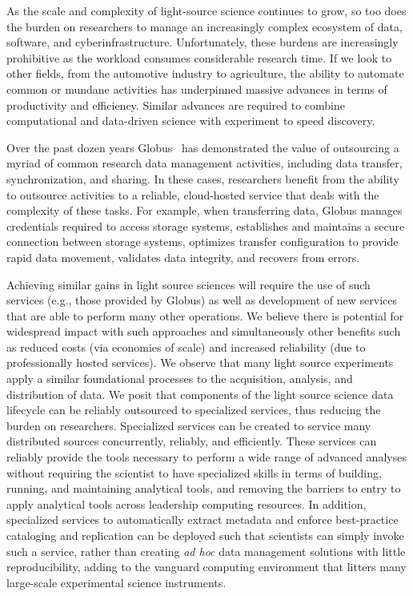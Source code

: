 \documentclass{aip-cp}
\newcommand\ian[1]{}
\newcommand\ryan[1]{}
\newcommand\ian[1]{{\color{red}[Ian: #1]}}
\newcommand\ryan[1]{{\color{green}[Ryan: #1]}}
\begin{document}
%


As the scale and complexity of light-source science continues to grow, so too
does the burden on researchers to manage an increasingly complex ecosystem of
data, software, and cyberinfrastructure.  Unfortunately, these burdens are
increasingly prohibitive as the workload consumes considerable
research time. If we look to other fields, from the automotive
industry to agriculture, the ability to automate common or mundane activities has
underpinned massive advances in terms of productivity and efficiency. Similar
advances are required to combine computational and data-driven science with
experiment to speed discovery.

Over the past dozen years Globus~\cite{chard14globus} has demonstrated the value of outsourcing
a myriad of common research data management activities, including data 
transfer, synchronization, and sharing. In these cases, researchers benefit
from the ability to outsource activities to a reliable, cloud-hosted
service that deals with the complexity of these tasks. For example, 
when transferring data, Globus manages credentials required to access
storage systems, establishes and maintains a secure connection between
storage systems, optimizes transfer configuration to provide rapid
data movement, validates data integrity, and recovers from errors. 

Achieving similar gains in light source sciences will require 
the use of such services (e.g., those provided by Globus) as 
well as development of new services that are able to perform 
many other operations.  We believe there is potential for widespread
impact with such approaches and simultaneously other benefits
such as reduced costs (via economies of scale) and increased reliability
(due to professionally hosted services). We observe that many 
light source experiments apply a similar foundational processes to the acquisition,
analysis, and  distribution of data. We posit that components of the light
source science data lifecycle can be reliably outsourced to specialized
services, thus reducing the burden on researchers. Specialized services can be
created to service many distributed sources concurrently, reliably, and efficiently.
These services can reliably provide the tools necessary to  perform a wide
range of advanced analyses without requiring the scientist to have specialized
skills in terms of building, running, and maintaining analytical tools, and
removing the barriers to entry to apply analytical tools across leadership
computing resources. In addition, specialized services to automatically
extract metadata and enforce best-practice cataloging and replication can be
deployed such that scientists can simply invoke such a service, rather than
creating \emph{ad hoc} data management solutions with little reproducibility, adding
to the vanguard computing environment that litters many large-scale
experimental science instruments.
\end{document}
